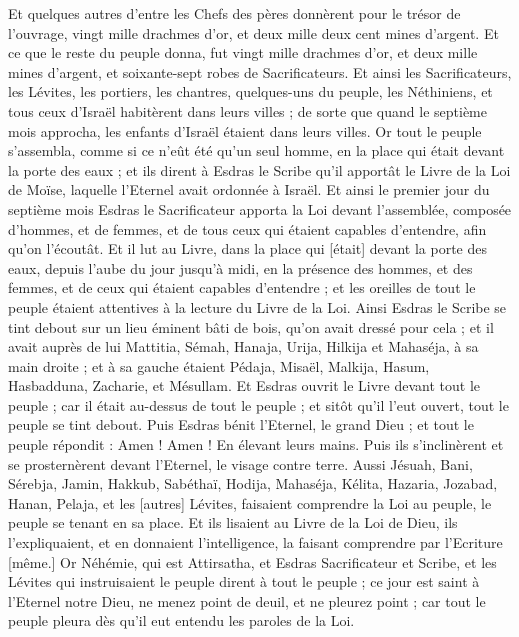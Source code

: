 \begin{multicols}{2}
Et quelques autres d'entre les Chefs des pères donnèrent pour le trésor de l'ouvrage, vingt mille drachmes d'or, et deux mille deux cent mines d'argent.
Et ce que le reste du peuple donna, fut vingt mille drachmes d'or, et deux mille mines d'argent, et soixante-sept robes de Sacrificateurs.
Et ainsi les Sacrificateurs, les Lévites, les portiers, les chantres, quelques-uns du peuple, les Néthiniens, et tous ceux d'Israël habitèrent dans leurs villes ; de sorte que quand le septième mois approcha, les enfants d'Israël étaient dans leurs villes.
\VerseOne{}Or tout le peuple s'assembla, comme si ce n'eût été qu'un seul homme, en la place qui était devant la porte des eaux ; et ils dirent à Esdras le Scribe qu'il apportât le Livre de la Loi de Moïse, laquelle l'Eternel avait ordonnée à Israël.
Et ainsi le premier jour du septième mois Esdras le Sacrificateur apporta la Loi devant l'assemblée, composée d'hommes, et de femmes, et de tous ceux qui étaient capables d'entendre, afin qu'on l'écoutât.
Et il lut au Livre, dans la place qui [était] devant la porte des eaux, depuis l'aube du jour jusqu'à midi, en la présence des hommes, et des femmes, et de ceux qui étaient capables d'entendre ; et les oreilles de tout le peuple étaient attentives à la lecture du Livre de la Loi.
Ainsi Esdras le Scribe se tint debout sur un lieu éminent bâti de bois, qu'on avait dressé pour cela ; et il avait auprès de lui Mattitia, Sémah, Hanaja, Urija, Hilkija et Mahaséja, à sa main droite ; et à sa gauche étaient Pédaja, Misaël, Malkija, Hasum, Hasbadduna, Zacharie, et Mésullam.
Et Esdras ouvrit le Livre devant tout le peuple ; car il était au-dessus de tout le peuple ; et sitôt qu'il l'eut ouvert, tout le peuple se tint debout.
Puis Esdras bénit l'Eternel, le grand Dieu ; et tout le peuple répondit : Amen ! Amen ! En élevant leurs mains. Puis ils s'inclinèrent et se prosternèrent devant l'Eternel, le visage contre terre.
Aussi Jésuah, Bani, Sérebja, Jamin, Hakkub, Sabéthaï, Hodija, Mahaséja, Kélita, Hazaria, Jozabad, Hanan, Pelaja, et les [autres] Lévites, faisaient comprendre la Loi au peuple, le peuple se tenant en sa place.
Et ils lisaient au Livre de la Loi de Dieu, ils l'expliquaient, et en donnaient l'intelligence, la faisant comprendre par l'Ecriture [même.]
Or Néhémie, qui est Attirsatha, et Esdras Sacrificateur et Scribe, et les Lévites qui instruisaient le peuple dirent à tout le peuple ; ce jour est saint à l'Eternel notre Dieu, ne menez point de deuil, et ne pleurez point ; car tout le peuple pleura dès qu'il eut entendu les paroles de la Loi.

\end{multicols}
